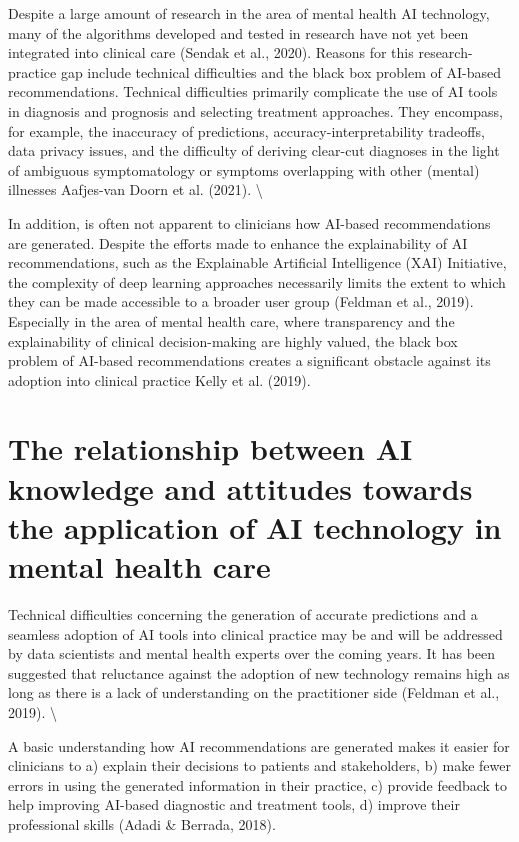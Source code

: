 \documentclass[
  man]{apa7}
\begin{document}
Despite a large amount of research in the area of mental health AI technology, many of the algorithms developed and tested in research have not yet been integrated into clinical care (Sendak et al., 2020).
Reasons for this research-practice gap include technical difficulties and the black box problem of AI-based recommendations.
Technical difficulties primarily complicate the use of AI tools in diagnosis and prognosis and selecting treatment approaches. They encompass, for example, the inaccuracy of predictions, accuracy-interpretability tradeoffs, data privacy issues, and the difficulty of deriving clear-cut diagnoses in the light of ambiguous symptomatology or symptoms overlapping with other (mental) illnesses Aafjes-van Doorn et al. (2021). \textbackslash{}

In addition, is often not apparent to clinicians how AI-based recommendations are generated.
Despite the efforts made to enhance the explainability of AI recommendations, such as the Explainable Artificial Intelligence (XAI) Initiative, the complexity of deep learning approaches necessarily limits the extent to which they can be made accessible to a broader user group (Feldman et al., 2019).
Especially in the area of mental health care, where transparency and the explainability of clinical decision-making are highly valued, the black box problem of AI-based recommendations creates a significant obstacle against its adoption into clinical practice Kelly et al. (2019).

\hypertarget{the-relationship-between-ai-knowledge-and-attitudes-towards-the-application-of-ai-technology-in-mental-health-care}{%
\section{The relationship between AI knowledge and attitudes towards the application of AI technology in mental health care}\label{the-relationship-between-ai-knowledge-and-attitudes-towards-the-application-of-ai-technology-in-mental-health-care}}

Technical difficulties concerning the generation of accurate predictions and a seamless adoption of AI tools into clinical practice may be and will be addressed by data scientists and mental health experts over the coming years.
It has been suggested that reluctance against the adoption of new technology remains high as long as there is a lack of understanding on the practitioner side (Feldman et al., 2019). \textbackslash{}

A basic understanding how AI recommendations are generated makes it easier for clinicians to a) explain their decisions to patients and stakeholders, b) make fewer errors in using the generated information in their practice, c) provide feedback to help improving AI-based diagnostic and treatment tools, d) improve their professional skills (Adadi \& Berrada, 2018).
\end{document}
